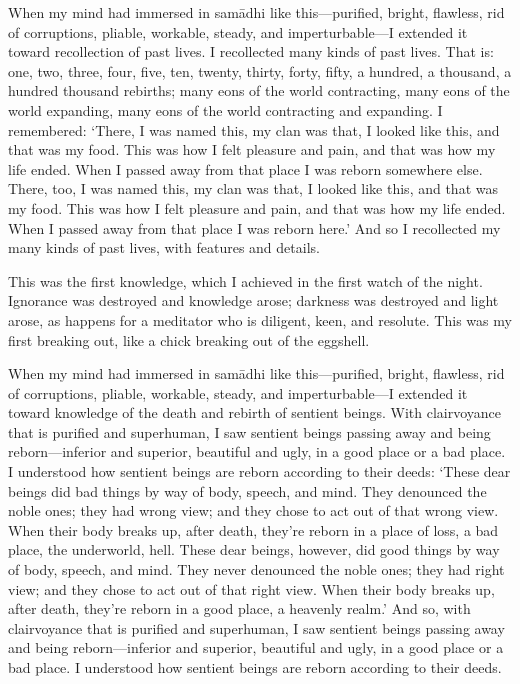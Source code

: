 \documentclass[12pt,openany]{book}%
\begin{document}
When my mind had immersed in \textsanskrit{samādhi} like this—purified, bright, flawless, rid of corruptions, pliable, workable, steady, and imperturbable—I extended it toward recollection of past lives. I recollected many kinds of past lives. That is: one, two, three, four, five, ten, twenty, thirty, forty, fifty, a hundred, a thousand, a hundred thousand rebirths; many eons of the world contracting, many eons of the world expanding, many eons of the world contracting and expanding. I remembered: ‘There, I was named this, my clan was that, I looked like this, and that was my food. This was how I felt pleasure and pain, and that was how my life ended. When I passed away from that place I was reborn somewhere else. There, too, I was named this, my clan was that, I looked like this, and that was my food. This was how I felt pleasure and pain, and that was how my life ended. When I passed away from that place I was reborn here.’ And so I recollected my many kinds of past lives, with features and details. 

This was the first knowledge, which I achieved in the first watch of the night. Ignorance was destroyed and knowledge arose; darkness was destroyed and light arose, as happens for a meditator who is diligent, keen, and resolute. This was my first breaking out, like a chick breaking out of the eggshell. 

When my mind had immersed in \textsanskrit{samādhi} like this—purified, bright, flawless, rid of corruptions, pliable, workable, steady, and imperturbable—I extended it toward knowledge of the death and rebirth of sentient beings. With clairvoyance that is purified and superhuman, I saw sentient beings passing away and being reborn—inferior and superior, beautiful and ugly, in a good place or a bad place. I understood how sentient beings are reborn according to their deeds: ‘These dear beings did bad things by way of body, speech, and mind. They denounced the noble ones; they had wrong view; and they chose to act out of that wrong view. When their body breaks up, after death, they’re reborn in a place of loss, a bad place, the underworld, hell. These dear beings, however, did good things by way of body, speech, and mind. They never denounced the noble ones; they had right view; and they chose to act out of that right view. When their body breaks up, after death, they’re reborn in a good place, a heavenly realm.’ And so, with clairvoyance that is purified and superhuman, I saw sentient beings passing away and being reborn—inferior and superior, beautiful and ugly, in a good place or a bad place. I understood how sentient beings are reborn according to their deeds. 
\end{document}
